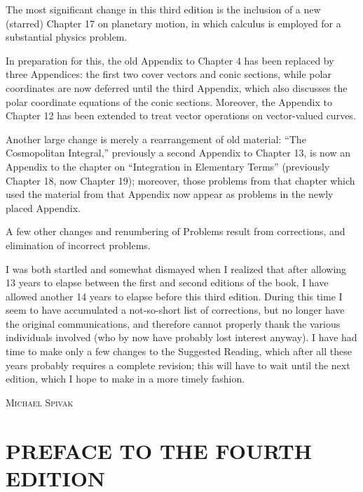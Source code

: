The most significant change in this third edition is the inclusion of a new
(starred) Chapter 17 on planetary motion, in which calculus is employed for a
substantial physics problem.

In preparation for this, the old Appendix to Chapter 4 has been replaced by
three Appendices: the first two cover vectors and conic sections, while polar
coordinates are now deferred until the third Appendix, which also discusses
the polar coordinate equations of the conic sections. Moreover, the Appendix
to Chapter 12 has been extended to treat vector operations on vector-valued
curves.

Another large change is merely a rearrangement of old material: ``The
Cosmopolitan Integral,'' previously a second Appendix to Chapter 13, is now an
Appendix to the chapter on ``Integration in Elementary Terms'' (previously
Chapter 18, now Chapter 19); moreover, those problems from that chapter which
used the material from that Appendix now appear as problems in the newly
placed Appendix.

A few other changes and renumbering of Problems result from corrections, and
elimination of incorrect problems.

I was both startled and somewhat dismayed when I realized that after allowing
13 years to elapse between the first and second editions of the book, I have
allowed another 14 years to elapse before this third edition. During this time
I seem to have accumulated a not-so-short list of corrections, but no longer
have the original communications, and therefore cannot properly thank the
various individuals involved (who by now have probably lost interest anyway).
I have had time to make only a few changes to the Suggested Reading, which
after all these years probably requires a complete revision; this will have to
wait until the next edition, which I hope to make in a more timely fashion.

\begin{flushright}
  \begin{minipage}{0.4\textwidth}
    \vspace{2em}
    \scshape Michael Spivak
  \end{minipage}
\end{flushright}

\clearpage
\section*{\mdseries PREFACE TO THE FOURTH EDITION}


